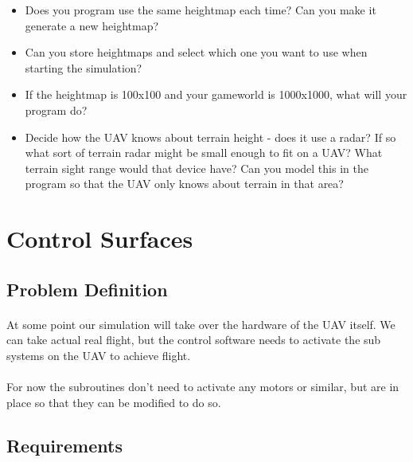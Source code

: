 \documentclass[11pt]{book}
\begin{document}
\begin{itemize}
\item Does you program use the same heightmap each time? Can you make it generate a new heightmap?
\item Can you store heightmaps and select which one you want to use when starting the simulation?
\item If the heightmap is 100x100 and your gameworld is 1000x1000, what will your program do?
\item Decide how the UAV knows about terrain height - does it use a radar? If so what sort of terrain radar might be small enough to fit on a UAV? What terrain sight range would that device have? Can you model this in the program so that the UAV only knows about terrain in that area?
\end{itemize}

\clearpage


\section{Control Surfaces}

\subsection{Problem Definition}

\paragraph{} At some point our simulation will take over the hardware of the UAV itself. We can take actual real flight, but the control software needs to activate the sub systems on the UAV to achieve flight.

\paragraph{} For now the subroutines don't need to activate any motors or similar, but are in place so that they can be modified to do so.

\subsection{Requirements}
\end{document}
